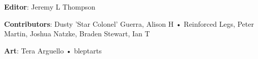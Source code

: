 \begin{description}

\item {\bfseries Editor}: Jeremy L Thompson

\item {\bfseries Contributors}: Dusty 'Star Colonel' Guerra, Alison H • Reinforced Legs, Peter Martin, Joshua Natzke, Braden Stewart, Ian T

\item {\bfseries Art}: Tera Arguello • bleptarts

\end{description}

